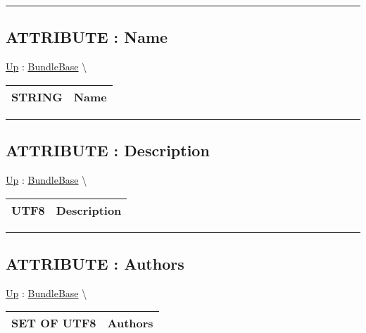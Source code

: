 \par


\rule{\linewidth}{0.5pt}
\subsection*{ATTRIBUTE : Name}
\hypertarget{ecldoc:bundlebase.name}{}
\hyperlink{ecldoc:BundleBase}{Up} :
\hspace{0pt} \hyperlink{ecldoc:BundleBase}{BundleBase} \textbackslash 

{\renewcommand{\arraystretch}{1.5}
\begin{tabularx}{\textwidth}{|>{\raggedright\arraybackslash}l|X|}
\hline
\hspace{0pt}STRING & Name \\
\hline
\end{tabularx}
}

\par


\rule{\linewidth}{0.5pt}
\subsection*{ATTRIBUTE : Description}
\hypertarget{ecldoc:bundlebase.description}{}
\hyperlink{ecldoc:BundleBase}{Up} :
\hspace{0pt} \hyperlink{ecldoc:BundleBase}{BundleBase} \textbackslash 

{\renewcommand{\arraystretch}{1.5}
\begin{tabularx}{\textwidth}{|>{\raggedright\arraybackslash}l|X|}
\hline
\hspace{0pt}UTF8 & Description \\
\hline
\end{tabularx}
}

\par


\rule{\linewidth}{0.5pt}
\subsection*{ATTRIBUTE : Authors}
\hypertarget{ecldoc:bundlebase.authors}{}
\hyperlink{ecldoc:BundleBase}{Up} :
\hspace{0pt} \hyperlink{ecldoc:BundleBase}{BundleBase} \textbackslash 

{\renewcommand{\arraystretch}{1.5}
\begin{tabularx}{\textwidth}{|>{\raggedright\arraybackslash}l|X|}
\hline
\hspace{0pt}SET OF UTF8 & Authors \\
\hline
\end{tabularx}
}

